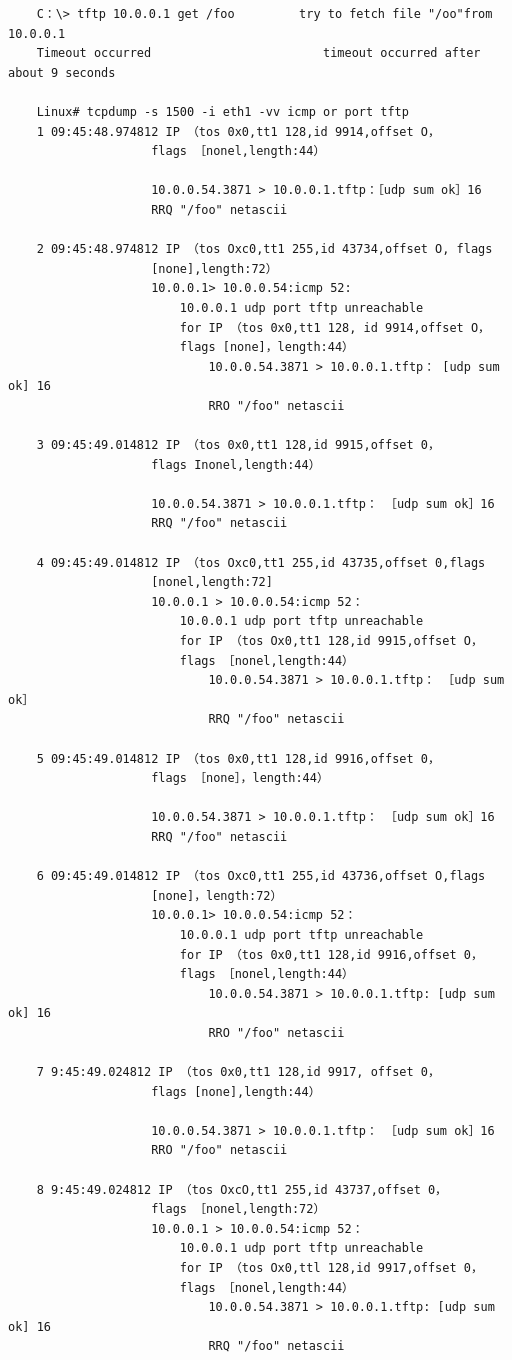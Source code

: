 \begin{verbatim}
	C：\> tftp 10.0.0.1 get /foo			try to fetch file "/oo"from 10.0.0.1
	Timeout occurred						timeout occurred after about 9 seconds

	Linux# tcpdump -s 1500 -i eth1 -vv icmp or port tftp
	1 09:45:48.974812 IP （tos 0x0,tt1 128,id 9914,offset O，
					flags ［nonel,length:44）

					10.0.0.54.3871 > 10.0.0.1.tftp：［udp sum ok］16
					RRQ "/foo" netascii

	2 09:45:48.974812 IP （tos Oxc0,tt1 255,id 43734,offset O, flags
					[none],length:72）
					10.0.0.1> 10.0.0.54:icmp 52:
						10.0.0.1 udp port tftp unreachable
						for IP （tos 0x0,tt1 128, id 9914,offset O，
						flags [none]，length:44）
							10.0.0.54.3871 > 10.0.0.1.tftp： [udp sum ok] 16
							RRO "/foo" netascii

	3 09:45:49.014812 IP （tos 0x0,tt1 128,id 9915,offset 0，
					flags Inonel,length:44）
					
					10.0.0.54.3871 > 10.0.0.1.tftp： ［udp sum ok］16
					RRQ "/foo" netascii

	4 09:45:49.014812 IP （tos Oxc0,tt1 255,id 43735,offset 0,flags
					[nonel,length:72]
					10.0.0.1 > 10.0.0.54:icmp 52：
						10.0.0.1 udp port tftp unreachable
						for IP （tos Ox0,tt1 128,id 9915,offset O，
						flags ［nonel,length:44）
							10.0.0.54.3871 > 10.0.0.1.tftp： ［udp sum ok］
							RRQ "/foo" netascii

	5 09:45:49.014812 IP （tos 0x0,tt1 128,id 9916,offset 0，
					flags ［none］，length:44）

					10.0.0.54.3871 > 10.0.0.1.tftp： ［udp sum ok］16
					RRQ "/foo" netascii

	6 09:45:49.014812 IP （tos Oxc0,tt1 255,id 43736,offset O,flags
					[none]，length:72）
					10.0.0.1> 10.0.0.54:icmp 52：
						10.0.0.1 udp port tftp unreachable
						for IP （tos 0x0,tt1 128,id 9916,offset 0，
						flags ［nonel,length:44）
							10.0.0.54.3871 > 10.0.0.1.tftp: [udp sum ok] 16
							RRO "/foo" netascii

	7 9:45:49.024812 IP （tos 0x0,tt1 128,id 9917, offset 0，
					flags [none],length:44）
					
					10.0.0.54.3871 > 10.0.0.1.tftp： ［udp sum ok］16
					RRO "/foo" netascii

	8 9:45:49.024812 IP （tos OxcO,tt1 255,id 43737,offset 0，
					flags ［nonel,length:72）
					10.0.0.1 > 10.0.0.54:icmp 52：
						10.0.0.1 udp port tftp unreachable
						for IP （tos Ox0,ttl 128,id 9917,offset 0，
						flags ［nonel,length:44）
							10.0.0.54.3871 > 10.0.0.1.tftp: [udp sum ok] 16
							RRQ "/foo" netascii


\end{verbatim}
